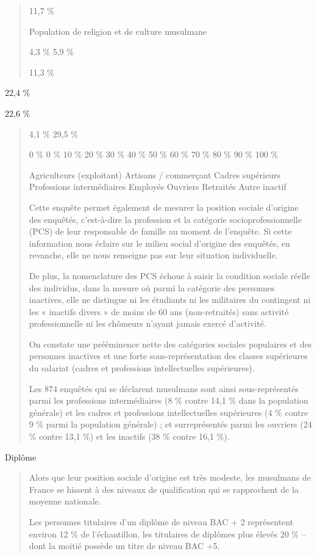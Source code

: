 \begin{quote}
11,7 \%

Population de religion et de culture musulmane

4,3 \% 5,9 \%

11,3 \%
\end{quote}

22,4 \%

22,6 \%

\begin{quote}
4,1 \% 29,5 \%

0 \% 0 \% 10 \% 20 \% 30 \% 40 \% 50 \% 60 \% 70 \% 80 \% 90 \% 100 \%

Agriculteurs (exploitant) Artisans / commerçant Cadres supérieurs
Professions intermédiaires Employés Ouvriers Retraités Autre inactif

Cette enquête permet également de mesurer la position sociale d'origine
des enquêtés, c'est-à-dire la profession et la catégorie
socioprofessionnelle (PCS) de leur responsable de famille au moment de
l'enquête. Si cette information nous éclaire sur le milieu social
d'origine des enquêtés, en revanche, elle ne nous renseigne pas sur leur
situation individuelle.

De plus, la nomenclature des PCS échoue à saisir la condition sociale
réelle des individus, dans la mesure où parmi la catégorie des personnes
inactives, elle ne distingue ni les étudiants ni les militaires du
contingent ni les « inactifs divers » de moins de 60 ans (non-retraités)
sans activité professionnelle ni les chômeurs n'ayant jamais exercé
d'activité.

On constate une prééminence nette des catégories sociales populaires et
des personnes inactives et une forte sous-représentation des classes
supérieures du salariat (cadres et professions intellectuelles
supérieures).

Les 874 enquêtés qui se déclarent musulmans sont ainsi sous-représentés
parmi les professions intermédiaires (8 \% contre 14,1 \% dans la
population générale) et les cadres et professions intellectuelles
supérieures (4 \% contre 9 \% parmi la population générale) ; et
surreprésentés parmi les ouvriers (24 \% contre 13,1 \%) et les inactifs
(38 \% contre 16,1 \%).


\end{quote}

Diplôme

\begin{quote}
Alors que leur position sociale d'origine est très modeste, les
musulmans de France se hissent à des niveaux de qualification qui se
rapprochent de la moyenne nationale.

Les personnes titulaires d'un diplôme de niveau BAC + 2 représentent
environ 12 \% de l'échantillon, les titulaires de diplômes plus élevés
20 \% -- dont la moitié possède un titre de niveau BAC +5.
\end{quote}

